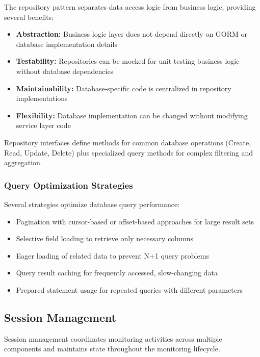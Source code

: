 The repository pattern separates data access logic from business logic, providing several benefits:

\begin{itemize}
    \item \textbf{Abstraction:} Business logic layer does not depend directly on GORM or database implementation details
    \item \textbf{Testability:} Repositories can be mocked for unit testing business logic without database dependencies
    \item \textbf{Maintainability:} Database-specific code is centralized in repository implementations
    \item \textbf{Flexibility:} Database implementation can be changed without modifying service layer code
\end{itemize}

Repository interfaces define methods for common database operations (Create, Read, Update, Delete) plus specialized query methods for complex filtering and aggregation.

\subsubsection{Query Optimization Strategies}

Several strategies optimize database query performance:

\begin{itemize}
    \item Pagination with cursor-based or offset-based approaches for large result sets
    \item Selective field loading to retrieve only necessary columns
    \item Eager loading of related data to prevent N+1 query problems
    \item Query result caching for frequently accessed, slow-changing data
    \item Prepared statement usage for repeated queries with different parameters
\end{itemize}

\subsection{Session Management}

Session management coordinates monitoring activities across multiple components and maintains state throughout the monitoring lifecycle.

